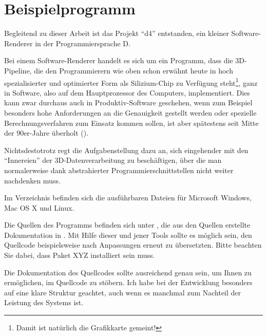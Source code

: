 \chapter{Beispielprogramm}

Begleitend zu dieser Arbeit ist das Projekt \enquote{d4} entstanden, ein kleiner Software-Renderer in der Programmiersprache D.

Bei einem Software-Renderer handelt es sich um ein Programm, dass die 3D-Pipeline, die den Programmierern wie oben schon erwähnt heute in hoch spezialisierter und optimierter Form als Silizium-Chip zu Verfügung steht\footnote{Damit ist natürlich die Grafikkarte gemeint!}, ganz in Software, also auf dem Hauptprozessor des Computers, implementiert. Dies kann zwar durchaus auch in Produktiv-Software geschehen, wenn zum Beispiel besonders hohe Anforderungen an die Genauigkeit gestellt werden oder spezielle Berechnungsverfahren zum Einsatz kommen sollen, ist aber spätestens seit Mitte der 90er-Jahre überholt (\vgl \citep{wiki:grafikkarte}).

Nichtsdestotrotz regt die Aufgabenstellung dazu an, sich eingehender mit den \enquote{Innereien} der 3D-Datenverarbeitung zu beschäftigen, über die man normalerweise dank abstrahierter Programmierschnittstellen nicht weiter nachdenken muss.

Im Verzeichnis  befinden sich die ausführbaren Dateien für Microsoft Windows, Mac OS X und Linux.

Die Quellen des Programms befinden sich unter , die aus den Quellen erstellte Dokumentation in . Mit Hilfe dieser und jener Tools sollte es möglich sein, den Quellcode beispielsweise nach Anpassungen erneut zu übersetzten. Bitte beachten Sie dabei, dass Paket XYZ installiert sein muss.

Die Dokumentation des Quellcodes sollte ausreichend genau sein, um Ihnen zu ermöglichen, im Quellcode zu stöbern. Ich habe bei der Entwicklung besonders auf eine klare Struktur geachtet, auch wenn es manchmal zum Nachteil der Leistung des Systems ist.